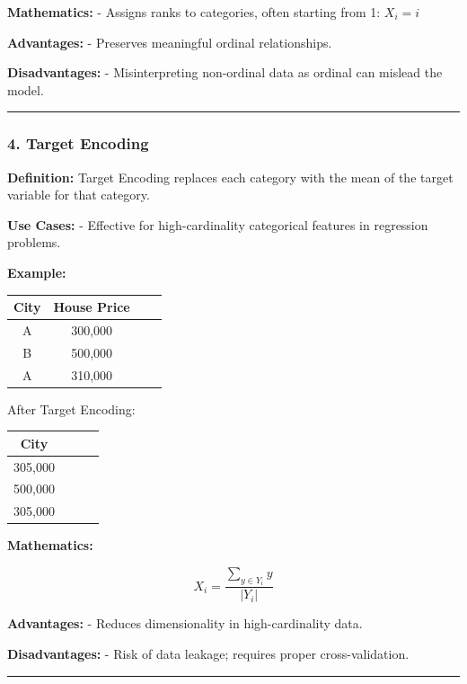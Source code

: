 \documentclass[12pt]{book}
\begin{document}
\textbf{Mathematics:} - Assigns ranks to categories, often starting from
1: \( X_{i} = i \)

\textbf{Advantages:} - Preserves meaningful ordinal relationships.

\textbf{Disadvantages:} - Misinterpreting non-ordinal data as ordinal
can mislead the model.

\begin{center}\rule{0.5\linewidth}{0.5pt}\end{center}

\subsubsection{\texorpdfstring{4. \textbf{Target
Encoding}}{4. Target Encoding}}\label{target-encoding}

\textbf{Definition:} Target Encoding replaces each category with the
mean of the target variable for that category.

\textbf{Use Cases:} - Effective for high-cardinality categorical
features in regression problems.

\textbf{Example:} 

\begin{tabular}{|c|c|c|c|}
  \hline
  \textbf{City} & \textbf{House Price} \\ \hline
  A & 300,000 \\ \hline
  B & 500,000 \\ \hline
  A & 310,000 \\ \hline
\end{tabular}


After Target Encoding: 

\begin{tabular}{|c|c|c|c|}
  \hline
  \textbf{City} \\ \hline
  305,000 \\ \hline
  500,000 \\ \hline
  305,000 \\ \hline
\end{tabular}




\textbf{Mathematics:} 

\[ 
X_{i} = \frac{\sum_{y \in Y_{i}} y}{|Y_i|} 
\]

\textbf{Advantages:} - Reduces dimensionality in high-cardinality data.

\textbf{Disadvantages:} - Risk of data leakage; requires proper
cross-validation.

\begin{center}\rule{0.5\linewidth}{0.5pt}\end{center}
\end{document}
